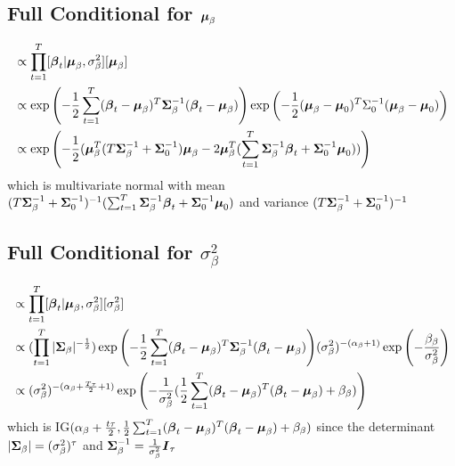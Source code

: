 \documentclass[fleqn]{article}
\def\bm#1{\mbox{\boldmath $#1$}}
\begin{document}
\subsection{Full Conditional for $\bm{\mu}_\beta$}
%
\begin{align*}
[\bm{\mu}_\beta | \cdot] & \propto \prod_{t = 1}^T [\bm{\beta}_t | \bm{\mu}_\beta, \sigma^2_\beta] [\bm{\mu}_\beta]\\
%
& \propto \exp{ \left( - \frac{1} {2} \sum_{t = 1}^T (\bm{\beta}_t - \bm{\mu}_\beta)^T \bm{\Sigma}_\beta^{ - 1} (\bm{\beta}_t - \bm{\mu}_\beta) \right) } \exp{ \left( - \frac{1} {2} (\bm{\mu}_\beta - \bm{\mu}_0)^T \Sigma_0^{ - 1} (\bm{\mu}_\beta - \bm{\mu}_0) \right)}\\
%
& \propto \exp{ \left( - \frac{1} {2} (\bm{\mu}_\beta^T (T \bm{\Sigma}_\beta^{ - 1} + \bm{\Sigma}_0^{ - 1}) \bm{\mu}_\beta - 2 \bm{\mu}_\beta^T (\sum_{t = 1}^T \bm{\Sigma}_\beta^{ - 1} \bm{\beta}_t + \bm{\Sigma}_0^{ - 1} \bm{\mu}_0) ) \right) }
\end{align*}
%
which is multivariate normal with mean
$(T \bm{\Sigma}_\beta^{ - 1} + \bm{\Sigma}_0^{ - 1})^{ - 1} (\sum_{t = 1}^T \bm{\Sigma}_\beta^{ - 1} \bm{\beta}_t + \bm{\Sigma}_0^{ - 1} \bm{\mu}_0)$ and variance $(T \bm{\Sigma}_\beta^{ - 1} + \bm{\Sigma}_0^{ - 1})^{ - 1}$
%
\subsection{Full Conditional for $\sigma^2_\beta$}
%
\begin{align*}
[\sigma^2_\beta | \cdot] & \propto \prod_{t = 1}^T [\bm{\beta}_t | \bm{\mu}_\beta, \sigma^2_\beta] [\sigma^2_\beta]\\
%
& \propto (\prod_{t = 1}^T |\bm{\Sigma}_\beta|^{ - \frac{1} {2}}) \exp{ \left( - \frac{1} {2} \sum_{t = 1}^T (\bm{\beta}_t - \bm{\mu}_\beta)^T \bm{\Sigma}_\beta^{ - 1} (\bm{\beta}_t - \bm{\mu}_\beta) \right) } (\sigma^2_\beta)^{ - (\alpha_\beta + 1)} \exp{ \left( - \frac{\beta_\beta} {\sigma^2_\beta} \right) }\\
%
& \propto (\sigma^2_\beta)^{ - (\alpha_\beta + \frac{T \tau} {2} + 1)} \exp{ \left( - \frac{1} {\sigma^2_\beta} (\frac{1} {2} \sum_{t = 1}^T (\bm{\beta}_t - \bm{\mu}_\beta)^T (\bm{\beta}_t - \bm{\mu}_\beta) + \beta_\beta) \right) }
\end{align*}
%
which is IG$(\alpha_\beta + \frac{t \tau} {2}, \frac{1} {2} \sum_{t = 1}^T (\bm{\beta}_t - \bm{\mu}_\beta)^T (\bm{\beta}_t - \bm{\mu}_\beta) + \beta_\beta)$ since the determinant $|\bm{\Sigma}_\beta| = (\sigma^2_\beta)^\tau$ and $\bm{\Sigma}_\beta^{ - 1} = \frac{1} {\sigma^2_\beta} \bm{I}_\tau$
%
\end{document}
